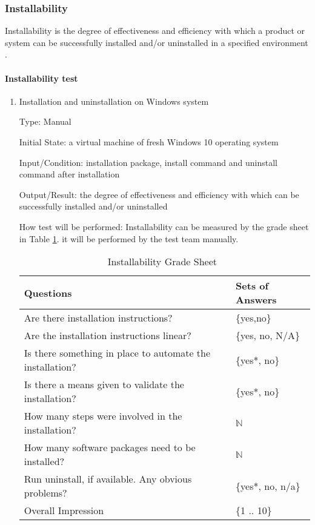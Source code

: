 \documentclass[12pt, titlepage]{article}
\begin{document}
\subsubsection{Installability}
\label{sec_installtest} Installability is the degree of effectiveness and
efficiency with which a product or system can be successfully installed and/or
uninstalled in a specified environment \cite{ISO/IEC25010:2011}.
	
\paragraph{Installability test}

\begin{enumerate}

\item{Installation and uninstallation on Windows system}

Type: Manual
					
Initial State: a virtual machine of fresh Windows 10 operating system
					
Input/Condition: \progname{} installation package, install command and uninstall
command after installation
					
Output/Result: the degree of effectiveness and efficiency with which \progname{}
can be successfully installed and/or uninstalled
					
How test will be performed: Installability can be measured by the grade sheet in
Table \ref{Tb_install}. it will be performed by the test team manually.

\begin{table}[h]
\begin{tabular}{@{}ll@{}}
\toprule
Questions & Sets of Answers \\ \midrule
Are there installation instructions? & \{yes,no\} \\
Are the installation instructions linear? & \{yes, no, N/A\} \\
Is there something in place to automate the installation? & \{yes*, no\} \\
Is there a means given to validate the installation? & \{yes*, no\} \\
How many steps were involved in the installation? & $\mathbb{N}$ \\
How many software packages need to be installed? & $\mathbb{N}$ \\
Run uninstall, if available. Any obvious problems? & \{yes*, no, n/a\} \\
Overall Impression & \{1 .. 10\}\\ \bottomrule
\end{tabular}
\caption{Installability Grade Sheet~\cite{SmithEtAl2018}}
\label{Tb_install}
\end{table}


\end{enumerate}
\end{document}
